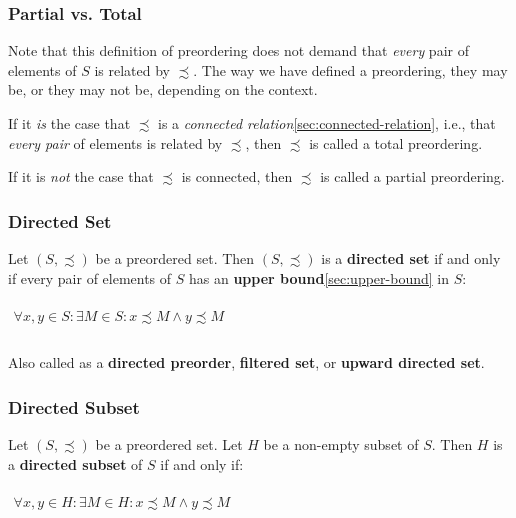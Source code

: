 \subsubsection{Partial vs. Total}

Note that this definition of preordering does not demand that
\textit{every} pair of elements of $S$ is related by $\precsim$. The
way we have defined a preordering, they may be, or they may not be,
depending on the context.

If it \textit{is} the case that $\precsim$ is a \textit{connected
  relation}\ref{sec:connected-relation}, i.e., that \textit{every
  pair} of elements is related by $\precsim$, then $\precsim$ is
called a total preordering.

If it is \textit{not} the case that $\precsim$ is connected, then
$\precsim$ is called a partial preordering.


\subsubsection{Directed Set}
\label{sec:directed-set}

Let $(S, \precsim)$ be a preordered set. Then $(S, \precsim)$ is a
\textbf{directed set} if and only if every pair of elements of $S$ has
an \textbf{upper bound}\ref{sec:upper-bound} in $S$:

\begin{math}
  \begin{array}{c}
    \\
    \forall x, y \in S: \exists M \in S: x \precsim M \land y \precsim M \\
    \\
  \end{array}
\end{math}

Also called as a \textbf{directed preorder}, \textbf{filtered set}, or
\textbf{upward directed set}.

\subsubsection{Directed Subset}
\label{sec:directed-subset}

Let $(S, \precsim)$ be a preordered set. Let $H$ be a non-empty subset
of $S$. Then $H$ is a \textbf{directed subset} of $S$ if and only if:

\begin{math}
  \begin{array}{c}
    \\
    \forall x, y \in H: \exists M \in H: x \precsim M \land y \precsim M\\
    \\
  \end{array}
\end{math}



